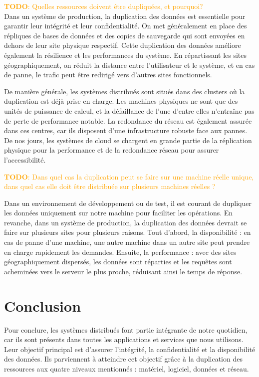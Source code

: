 \documentclass[a11paper, 11pt]{article}
\newcommand{\todo}[1]{\textcolor{orange}{\textbf{TODO}: #1}}
\begin{document}
\todo{Quelles ressources doivent être dupliquées, et pourquoi?} \\
Dans un système de production, la duplication des données est essentielle pour garantir leur intégrité et leur confidentialité. On met généralement en place des répliques de bases de données et des copies de sauvegarde qui sont envoyées en dehors de leur site physique respectif. Cette duplication des données améliore également la résilience et les performances du système. En répartissant les sites géographiquement, on réduit la distance entre l'utilisateur et le système, et en cas de panne, le trafic peut être redirigé vers d'autres sites fonctionnels.


De manière générale, les systèmes distribués sont situés dans des clusters où la duplication est déjà prise en charge. Les machines physiques ne sont que des unités de puissance de calcul, et la défaillance de l'une d'entre elles n'entraîne pas de perte de performance notable. La redondance du réseau est également assurée dans ces centres, car ils disposent d'une infrastructure robuste face aux pannes. De nos jours, les systèmes de cloud se chargent en grande partie de la réplication physique pour la performance et de la redondance réseau pour assurer l'accessibilité. 

\todo{Dans quel cas la duplication peut se faire sur une machine réelle unique, dans
quel cas elle doit être distribuée sur plusieurs machines réelles ?}

Dans un environnement de développement ou de test, il est courant de dupliquer les données uniquement sur notre machine pour faciliter les opérations. En revanche, dans un système de production, la duplication des données devrait se faire sur plusieurs sites pour plusieurs raisons. Tout d'abord, la disponibilité : en cas de panne d'une machine, une autre machine dans un autre site peut prendre en charge rapidement les demandes. Ensuite, la performance : avec des sites géographiquement dispersés, les données sont réparties et les requêtes sont acheminées vers le serveur le plus proche, réduisant ainsi le temps de réponse.

\section{Conclusion}
Pour conclure, les systèmes distribués font partie intégrante de notre quotidien, car ils sont présents dans toutes les applications et services que nous utilisons. Leur objectif principal est d'assurer l'intégrité, la confidentialité et la disponibilité des données. Ils parviennent à atteindre cet objectif grâce à la duplication des ressources aux quatre niveaux mentionnés : matériel, logiciel, données et réseau.
\end{document}
